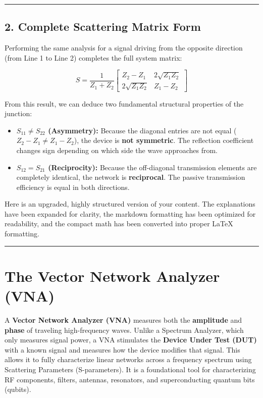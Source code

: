 \documentclass[
]{article}
\providecommand{\tightlist}{%
  \setlength{\itemsep}{0pt}\setlength{\parskip}{0pt}}
\begin{document}
\begin{center}\rule{0.5\linewidth}{0.5pt}\end{center}

\subsection{2. Complete Scattering Matrix
Form}\label{complete-scattering-matrix-form}

Performing the same analysis for a signal driving from the opposite
direction (from Line 1 to Line 2) completes the full system matrix:

\[S = \frac{1}{Z_1 + Z_2} \begin{bmatrix} Z_2 - Z_1 & 2\sqrt{Z_1 Z_2} \\ 2\sqrt{Z_1 Z_2} & Z_1 - Z_2 \end{bmatrix}\]

From this result, we can deduce two fundamental structural properties of
the junction:

\begin{itemize}
\tightlist
\item
  \textbf{\(S_{11} \neq S_{22}\) (Asymmetry):} Because the diagonal
  entries are not equal (\(Z_2 - Z_1 \neq Z_1 - Z_2\)), the device is
  \textbf{not symmetric}. The reflection coefficient changes sign
  depending on which side the wave approaches from.
\item
  \textbf{\(S_{12} = S_{21}\) (Reciprocity):} Because the off-diagonal
  transmission elements are completely identical, the network is
  \textbf{reciprocal}. The passive transmission efficiency is equal in
  both directions.
\end{itemize}

Here is an upgraded, highly structured version of your content. The
explanations have been expanded for clarity, the markdown formatting has
been optimized for readability, and the compact math has been converted
into proper LaTeX formatting.

\begin{center}\rule{0.5\linewidth}{0.5pt}\end{center}

\section{The Vector Network Analyzer
(VNA)}\label{the-vector-network-analyzer-vna}

A \textbf{Vector Network Analyzer (VNA)} measures both the
\textbf{amplitude} and \textbf{phase} of traveling high-frequency waves.
Unlike a Spectrum Analyzer, which only measures signal power, a VNA
stimulates the \textbf{Device Under Test (DUT)} with a known signal and
measures how the device modifies that signal. This allows it to fully
characterize linear networks across a frequency spectrum using
Scattering Parameters (S-parameters). It is a foundational tool for
characterizing RF components, filters, antennas, resonators, and
superconducting quantum bits (qubits).
\end{document}

